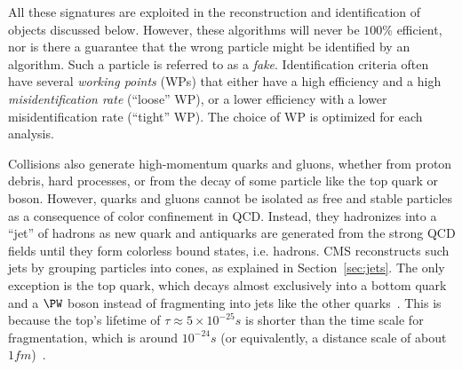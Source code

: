 All these signatures are exploited in the reconstruction and identification of objects discussed below. However, these algorithms will never be $100\%$ efficient, nor is there a guarantee that the wrong particle might be identified by an algorithm. Such a particle is referred to as a \emph{fake}. Identification criteria often have several \emph{working points} (WPs) that either have a high efficiency and a high \emph{misidentification rate} (``loose'' WP), or a lower efficiency with a lower misidentification rate (``tight'' WP). The choice of WP is optimized for each analysis.

Collisions also generate high-momentum quarks and gluons, whether from proton debris, hard processes, or from the decay of some particle like the top quark or {\PW} boson.
However, quarks and gluons cannot be isolated as free and stable particles as a consequence of color confinement in QCD. Instead, they hadronizes into a ``jet'' of hadrons as new quark and antiquarks are generated from the strong QCD fields until they form colorless bound states, i.e. hadrons.
CMS reconstructs such jets by grouping particles into cones, as explained in Section~\ref{sec:jets}. 
The only exception is the top quark, which decays almost exclusively into a bottom quark and a $\PW$ boson instead of fragmenting into jets like the other quarks~\cite{BR_tt}.
This is because the top's lifetime of $\tau\approx5\times10^{-25}\unit{s}$ is
shorter than the time scale for fragmentation, which is around $10^{-24}\unit{s}$ (or equivalently, a distance scale of about $1\unit{fm}$)~\cite{hadronization_timescale1,hadronization_timescale2}. %

